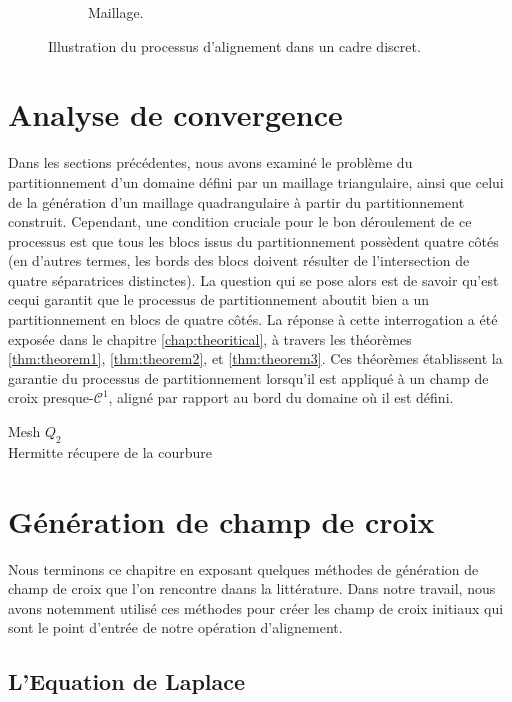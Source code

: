 \begin{figure}[h!]
\begin{subfigure}{0.482\textwidth}
    \caption{Maillage.}
    \label{fig:alignment_4}
\end{subfigure}
\caption{Illustration du processus d'alignement dans un cadre discret.}
\label{fig:alignment}
\end{figure}


\section{Analyse de convergence}
\label{subsec:analyse_convergence}

Dans les sections précédentes, nous avons examiné le problème du partitionnement d'un domaine défini par un maillage triangulaire, ainsi que celui de la génération d'un maillage quadrangulaire à partir du partitionnement construit. Cependant, une condition cruciale pour le bon déroulement de ce processus est que tous les blocs issus du partitionnement possèdent quatre côtés (en d'autres termes, les bords des blocs doivent résulter de l'intersection de quatre séparatrices distinctes). La question qui se pose alors est de savoir qu'est cequi garantit que le processus de partitionnement aboutit bien a un partitionnement en blocs de quatre côtés. La réponse à cette interrogation a été exposée dans le chapitre \ref{chap:theoritical}, à travers les théorèmes \ref{thm:theorem1}, \ref{thm:theorem2}, et \ref{thm:theorem3}. Ces théorèmes établissent la garantie du processus de partitionnement lorsqu'il est appliqué à un champ de croix presque-$\mathcal{C}^1$, aligné par rapport au bord du domaine où il est défini.


\color{red}
Mesh $Q_2$\\
Hermitte récupere de la courbure
\color{black}



\section{Génération de champ de croix}
\label{subsec:gen_cross_field}

Nous terminons ce chapitre en exposant quelques méthodes de génération de champ de croix que l'on rencontre daans la littérature. Dans notre travail, nous avons notemment utilisé ces méthodes pour créer les champ de croix initiaux qui sont le point d'entrée de notre opération d'alignement.

\subsection{L'Equation de Laplace}

